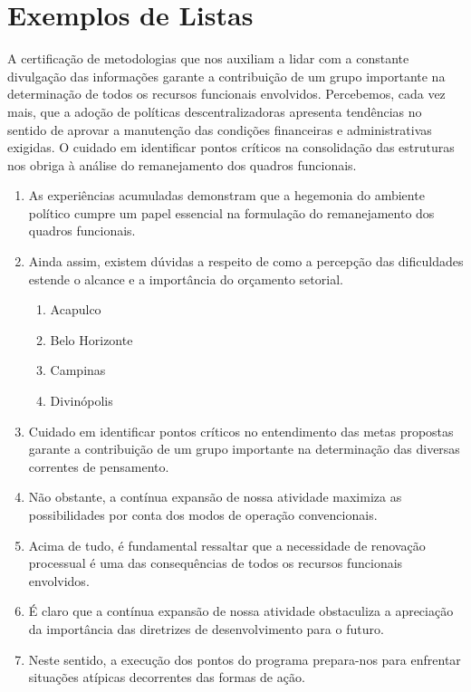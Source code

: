 \documentclass[fleqn]{icat-ufal}
\begin{document}
\section{Exemplos de Listas}
\label{sec:exemplos_listas}

A certificação de metodologias que nos auxiliam a lidar com a constante
divulgação das informações garante a contribuição de um grupo importante na
determinação de todos os recursos funcionais envolvidos. Percebemos, cada vez
mais, que a adoção de políticas descentralizadoras apresenta tendências no
sentido de aprovar a manutenção das condições financeiras e administrativas
exigidas. O cuidado em identificar pontos críticos na consolidação das
estruturas nos obriga à análise do remanejamento dos quadros funcionais. 

\begin{enumerate}
    
    \item As experiências acumuladas demonstram que a hegemonia do ambiente político
    cumpre um papel essencial na formulação do remanejamento dos quadros funcionais.
    
    \item Ainda assim, existem dúvidas a respeito de como a percepção das
    dificuldades estende o alcance e a importância do orçamento setorial.
    \begin{enumerate}
        \item Acapulco
        \item Belo Horizonte
        \item Campinas
        \item Divinópolis
    \end{enumerate}
    
    \item Cuidado em identificar pontos críticos no entendimento das metas
    propostas garante a contribuição de um grupo importante na determinação das
    diversas correntes de pensamento.
    
    \item Não obstante, a contínua expansão de nossa atividade maximiza as
    possibilidades por conta dos modos de operação convencionais.
    
    \item Acima de tudo, é fundamental ressaltar que a necessidade de renovação
    processual é uma das consequências de todos os recursos funcionais envolvidos.
    
    \item É claro que a contínua expansão de nossa atividade obstaculiza a apreciação
    da importância das diretrizes de desenvolvimento para o futuro.
    
    \item Neste sentido, a execução dos pontos do programa prepara-nos para enfrentar
    situações atípicas decorrentes das formas de ação. 
    
\end{enumerate}
\end{document}
